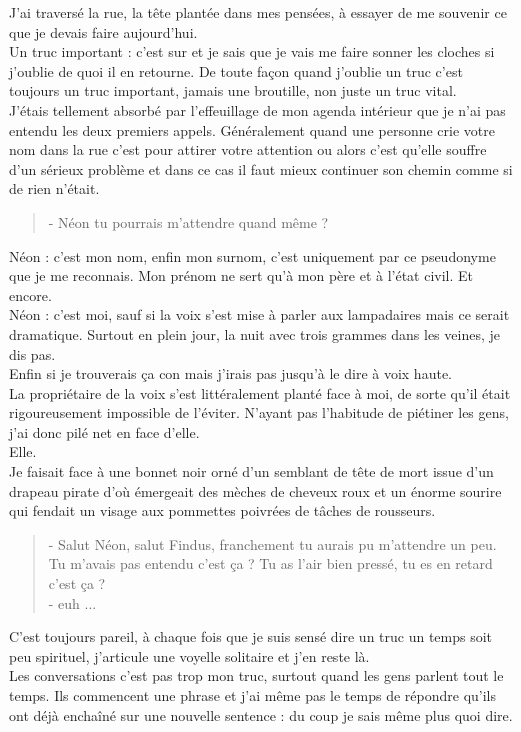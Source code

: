 J'ai traversé la rue, la tête plantée dans mes pensées, à essayer de me souvenir ce que je devais faire aujourd'hui. \\
Un truc important : c'est sur et je sais que je vais me faire sonner les cloches si j'oublie de quoi il en retourne. De toute façon quand j'oublie un truc c'est toujours un truc important, jamais une broutille, non juste un truc vital. \\

J'étais tellement absorbé par l’effeuillage de mon agenda intérieur que je n'ai pas entendu les deux premiers appels. Généralement quand une personne crie votre nom dans la rue c'est pour attirer votre attention ou alors c'est qu'elle souffre d'un sérieux problème et dans ce cas il faut mieux continuer son chemin comme si de rien n'était. \\

\begin{quote}
- Néon tu pourrais m'attendre quand même ? \\
\end{quote}

Néon : c'est mon nom, enfin mon surnom, c'est uniquement par ce pseudonyme que je me reconnais. Mon prénom ne sert qu'à mon père et à l'état civil. Et encore. \\
Néon : c'est moi, sauf si la voix s'est mise à parler aux lampadaires mais ce serait dramatique. Surtout en plein jour, la nuit avec trois grammes dans les veines, je dis pas. \\
Enfin si je trouverais ça con mais j'irais pas jusqu'à le dire à voix haute. \\

La propriétaire de la voix s'est littéralement planté face à moi, de sorte qu'il était rigoureusement impossible de l'éviter. N'ayant pas l'habitude de piétiner les gens, j'ai donc pilé net en face d'elle. \\
Elle.\\
Je faisait face à une bonnet noir orné d'un semblant de tête de mort issue d'un drapeau pirate d'où émergeait des mèches de cheveux roux et un énorme sourire qui fendait un visage aux pommettes poivrées de tâches de rousseurs. \\

\begin{quote}
- Salut Néon, salut Findus, franchement tu aurais pu m'attendre un peu. Tu m'avais pas entendu c'est ça ? Tu as l'air bien pressé, tu es en retard c'est ça ?\\
- euh ...
\end{quote}

C'est toujours pareil, à chaque fois que je suis sensé dire un truc un temps soit peu spirituel, j'articule une voyelle solitaire et j'en reste là. \\
Les conversations c'est pas trop mon truc, surtout quand les gens parlent tout le temps. Ils commencent une phrase et j'ai même pas le temps de répondre qu'ils ont déjà enchaîné sur une nouvelle sentence : du coup je sais même plus quoi dire.